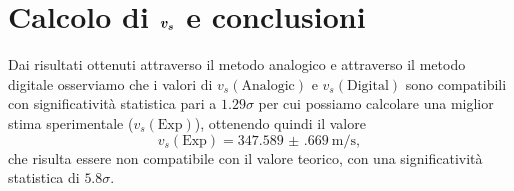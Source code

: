 \documentclass[
    rmp,
    reprint, 
    superscriptaddress, 
    altaffilletter, 
    amsmath, 
    amssymb, 
    a4paper,
    varvw]{revtex4-2}
\begin{document}
\iffalse
\fi

\section{Calcolo di $\vb*{v_s}$ e conclusioni}\label{sec:conclusion_compute}

Dai risultati ottenuti attraverso il metodo analogico e attraverso il metodo digitale osserviamo che i valori di $v_s(\text{Analogic})$ e $v_s(\text{Digital})$ sono compatibili con significatività statistica pari a $1.29\sigma$ per cui possiamo calcolare una miglior stima sperimentale ($v_s(\text{Exp})$), ottenendo quindi il valore \[v_s(\text{Exp}) = \SI{347.589(669)}{\metre\per\second},\] che risulta essere non compatibile con il valore teorico, con una significatività statistica di $5.8\sigma$. 
\end{document}

